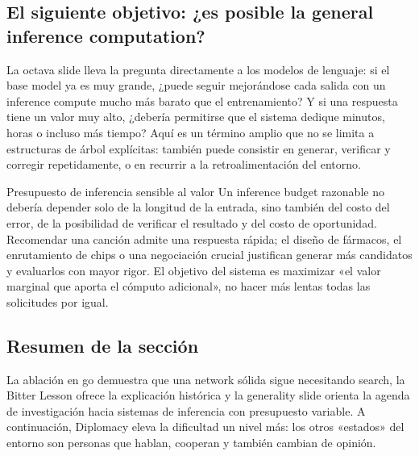 \subsection{El siguiente objetivo: ¿es posible la general inference computation?}

La octava slide lleva la pregunta directamente a los modelos de lenguaje: si el base model ya es muy grande, ¿puede seguir mejorándose cada salida con un inference compute mucho más barato que el entrenamiento? Y si una respuesta tiene un valor muy alto, ¿debería permitirse que el sistema dedique minutos, horas o incluso más tiempo? Aquí  es un término amplio que no se limita a estructuras de árbol explícitas: también puede consistir en generar, verificar y corregir repetidamente, o en recurrir a la retroalimentación del entorno.


\begin{importantbox}{Presupuesto de inferencia sensible al valor}
Un inference budget razonable no debería depender solo de la longitud de la entrada, sino también del costo del error, de la posibilidad de verificar el resultado y del costo de oportunidad. Recomendar una canción admite una respuesta rápida; el diseño de fármacos, el enrutamiento de chips o una negociación crucial justifican generar más candidatos y evaluarlos con mayor rigor. El objetivo del sistema es maximizar «el valor marginal que aporta el cómputo adicional», no hacer más lentas todas las solicitudes por igual.
\end{importantbox}


\subsection{Resumen de la sección}

La ablación en go demuestra que una network sólida sigue necesitando search, la Bitter Lesson ofrece la explicación histórica y la generality slide orienta la agenda de investigación hacia sistemas de inferencia con presupuesto variable. A continuación, Diplomacy eleva la dificultad un nivel más: los otros «estados» del entorno son personas que hablan, cooperan y también cambian de opinión.
